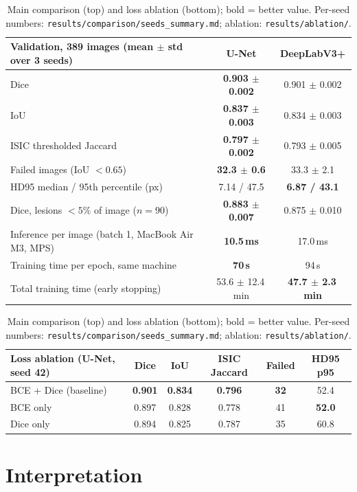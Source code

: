 \documentclass[11pt,a4paper]{article}
\begin{document}
\begin{table}[H]
\centering
\small
\begin{tabular}{lcc}
\toprule
\textbf{Validation, 389 images} (mean $\pm$ std over 3 seeds) & \textbf{U-Net} & \textbf{DeepLabV3+} \\
\midrule
Dice                                  & \textbf{0.903 $\pm$ 0.002} & 0.901 $\pm$ 0.002 \\
IoU                                   & \textbf{0.837 $\pm$ 0.003} & 0.834 $\pm$ 0.003 \\
ISIC thresholded Jaccard              & \textbf{0.797 $\pm$ 0.002} & 0.793 $\pm$ 0.005 \\
Failed images (IoU $<0.65$)           & \textbf{32.3 $\pm$ 0.6}    & 33.3 $\pm$ 2.1 \\
HD95 median / 95th percentile (px)    & 7.14 / 47.5                & \textbf{6.87 / 43.1} \\
Dice, lesions $<5\%$ of image ($n=90$) & \textbf{0.883 $\pm$ 0.007} & 0.875 $\pm$ 0.010 \\
\midrule
Inference per image (batch 1, MacBook Air M3, MPS) & \textbf{10.5\,ms} & 17.0\,ms \\
Training time per epoch, same machine & \textbf{70\,s} & 94\,s \\
Total training time (early stopping)  & 53.6 $\pm$ 12.4\,min & \textbf{47.7 $\pm$ 2.3\,min} \\
\bottomrule
\end{tabular}

\vspace{4pt}
\begin{tabular}{lccccc}
\toprule
\textbf{Loss ablation} (U-Net, seed 42) & \textbf{Dice} & \textbf{IoU} & \textbf{ISIC Jaccard} & \textbf{Failed} & \textbf{HD95 p95} \\
\midrule
BCE + Dice (baseline)      & \textbf{0.901} & \textbf{0.834} & \textbf{0.796} & \textbf{32} & 52.4 \\
BCE only                   & 0.897 & 0.828 & 0.778 & 41 & \textbf{52.0} \\
Dice only                  & 0.894 & 0.825 & 0.787 & 35 & 60.8 \\
\bottomrule
\end{tabular}
\caption{Main comparison (top) and loss ablation (bottom); bold = better value. Per-seed numbers:
\texttt{results/comparison/seeds\_summary.md}; ablation: \texttt{results/ablation/}.}
\label{tab:results}
\end{table}

\section{Interpretation}
\end{document}
